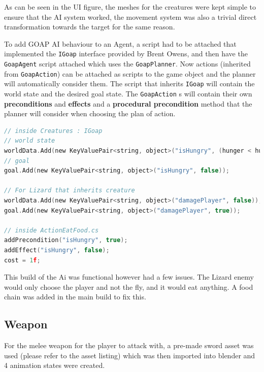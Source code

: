 \documentclass[12pt]{report}
\begin{document}
As can be seen in the UI figure, the meshes for the creatures were kept simple to ensure that the AI system worked, the movement system was also a trivial direct transformation towards the target for the same reason.

To add GOAP AI behaviour to an Agent, a script had to be attached that implemented the \lstinline{IGoap} interface provided by Brent Owens, and then have the \lstinline{GoapAgent} script attached which uses the \lstinline{GoapPlanner}. Now actions (inherited from \lstinline{GoapAction}) can be attached as scripts to the game object and the planner will automatically consider them. The script that inherits \lstinline{IGoap} will contain the world state and the desired goal state. The \lstinline{GoapAction} s will contain their own \textbf{preconditions} and \textbf{effects} and a \textbf{procedural precondition} method that the planner will consider when choosing the plan of action. 

\begin{lstlisting}[language=c]
// inside Creatures : IGoap 
// world state
worldData.Add(new KeyValuePair<string, object>("isHungry", (hunger < hungerThreshold)));
// goal
goal.Add(new KeyValuePair<string, object>("isHungry", false));

// For Lizard that inherits creature
worldData.Add(new KeyValuePair<string, object>("damagePlayer", false)); 
goal.Add(new KeyValuePair<string, object>("damagePlayer", true));
 
// inside ActionEatFood.cs
addPrecondition("isHungry", true);
addEffect("isHungry", false);
cost = 1f;
\end{lstlisting}

This build of the Ai was functional however had a few issues. The Lizard enemy would only choose the player and not the fly, and it would eat anything. A food chain was added in the main build to fix this.

\subsection{Weapon}
For the melee weapon for the player to attack with, a pre-made sword asset was used (please refer to the asset listing) which was then imported into blender and 4 animation states were created. 
\end{document}
